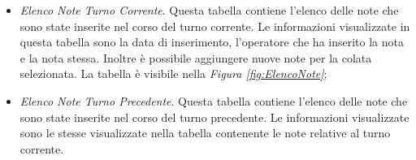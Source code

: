 \begin{itemize}
    \item \textit{Elenco Note Turno Corrente}. Questa tabella contiene l'elenco delle note che sono state inserite nel corso
    del turno corrente. Le informazioni visualizzate in questa tabella sono la data di inserimento, l'operatore che ha inserito
    la nota e la nota stessa. Inoltre è possibile aggiungere nuove note per la colata selezionata. La tabella è visibile nella 
    \textit{Figura \ref{fig:ElencoNote}};

    \item \textit{Elenco Note Turno Precedente}. Questa tabella contiene l'elenco delle note che sono state inserite nel corso
    del turno precedente. Le informazioni visualizzate sono le stesse visualizzate nella tabella contenente le note relative
    al turno corrente.
  \end{itemize}
 
